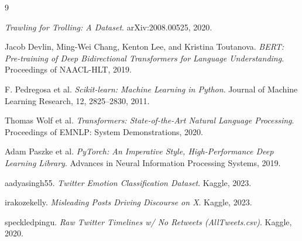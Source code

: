 \documentclass[11pt]{article}
\begin{document}
\begin{thebibliography}{9}

\textit{Trawling for Trolling: A Dataset}. arXiv:2008.00525, 2020.

Jacob Devlin, Ming-Wei Chang, Kenton Lee, and Kristina Toutanova.
\textit{BERT: Pre-training of Deep Bidirectional Transformers for Language Understanding}.
Proceedings of NAACL-HLT, 2019.

F. Pedregosa et al.
\textit{Scikit-learn: Machine Learning in Python}.
Journal of Machine Learning Research, 12, 2825--2830, 2011.

Thomas Wolf et al.
\textit{Transformers: State-of-the-Art Natural Language Processing}.
Proceedings of EMNLP: System Demonstrations, 2020.

Adam Paszke et al.
\textit{PyTorch: An Imperative Style, High-Performance Deep Learning Library}.
Advances in Neural Information Processing Systems, 2019.

aadyasingh55.
\textit{Twitter Emotion Classification Dataset}.
Kaggle, 2023.

irakozekelly.
\textit{Misleading Posts Driving Discourse on X}.
Kaggle, 2023.

speckledpingu.
\textit{Raw Twitter Timelines w/ No Retweets (AllTweets.csv)}.
Kaggle, 2020.

\end{thebibliography}
\end{document}
